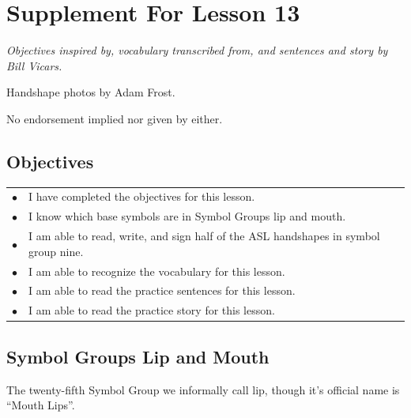 \documentclass{article}
\begin{document}
\newfontfamily{}
\newfontfamily{}
\newcommand{\bul}{\hfil$\bullet$&}
\renewenvironment{glossary}{\begin{multicols}{5}\begin{center}}{\end{center}\end{multicols}}
\setcounter{secnumdepth}{0}
\setlength{\columnseprule}{1pt}

\section{Supplement For Lesson 13}

\begin{center}
\it
Objectives inspired by, vocabulary transcribed from, and sentences and story by Bill Vicars.

Handshape photos by Adam Frost.

No endorsement implied nor given by either.
\end{center}

\subsection{Objectives}

\begin{tabular}{p{1cm}p{14cm}}
\bul I have completed the objectives for this lesson.\\
\bul I know which base symbols are in Symbol Groups lip and mouth.\\
\bul I am able to read, write, and sign half of the ASL handshapes in symbol group nine.\\
\bul I am able to recognize the vocabulary for this lesson.\\
\bul I am able to read the practice sentences for this lesson.\\
\bul I am able to read the practice story for this lesson.\\
\end{tabular}

\subsection{Symbol Groups Lip and Mouth}

The twenty-fifth Symbol Group we informally call lip, though it's official name is ``Mouth Lips''.
\end{document}
